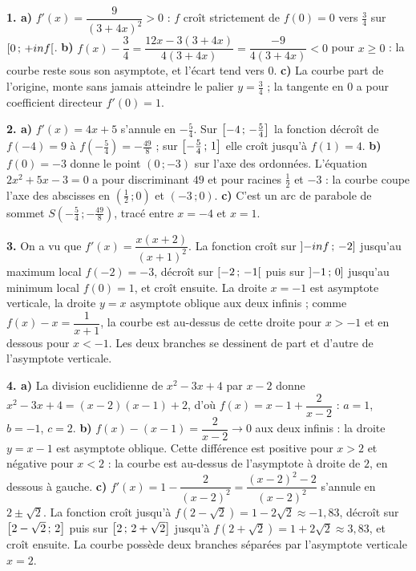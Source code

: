 \begin{corrige}[annales]
\textbf{1. a)} $f'(x) = \dfrac{9}{(3+4x)^{2}} > 0$ : $f$ croît strictement de
$f(0) = 0$ vers $\frac34$ sur $\left[0\,;\,+inf\right[$.
\textbf{b)} $f(x)-\dfrac34 = \dfrac{12x-3(3+4x)}{4(3+4x)}
= \dfrac{-9}{4(3+4x)} < 0$ pour $x \geq 0$ : la courbe reste sous son
asymptote, et l'écart tend vers $0$.
\textbf{c)} La courbe part de l'origine, monte sans jamais atteindre le
palier $y = \frac34$ ; la tangente en $0$ a pour coefficient directeur
$f'(0) = 1$.

\textbf{2. a)} $f'(x) = 4x+5$ s'annule en $-\frac54$. Sur
$\left[-4\,;\,-\frac54\right]$ la fonction décroît de $f(-4) = 9$ à
$f\left(-\frac54\right) = -\frac{49}{8}$ ; sur
$\left[-\frac54\,;\,1\right]$ elle croît jusqu'à $f(1) = 4$.
\textbf{b)} $f(0) = -3$ donne le point $(0\,;-3)$ sur l'axe des ordonnées.
L'équation $2x^{2}+5x-3 = 0$ a pour discriminant $49$ et pour racines
$\frac12$ et $-3$ : la courbe coupe l'axe des abscisses en
$\left(\frac12\,;0\right)$ et $(-3\,;0)$.
\textbf{c)} C'est un arc de parabole de sommet
$S\left(-\frac54\,;-\frac{49}{8}\right)$, tracé entre $x = -4$ et $x = 1$.

\textbf{3.} On a vu que
$f'(x) = \dfrac{x(x+2)}{(x+1)^{2}}$. La fonction croît sur
$\left]-inf\,;\,-2\right]$ jusqu'au maximum local $f(-2) = -3$, décroît sur
$\left[-2\,;\,-1\right[$ puis sur $\left]-1\,;\,0\right]$ jusqu'au minimum local
$f(0) = 1$, et croît ensuite. La droite $x = -1$ est asymptote verticale, la
droite $y = x$ asymptote oblique aux deux infinis ; comme
$f(x)-x = \dfrac{1}{x+1}$, la courbe est au-dessus de cette droite pour
$x > -1$ et en dessous pour $x < -1$. Les deux branches se dessinent de part
et d'autre de l'asymptote verticale.

\textbf{4. a)} La division euclidienne de $x^{2}-3x+4$ par $x-2$ donne
$x^{2}-3x+4 = (x-2)(x-1)+2$, d'où
$f(x) = x-1+\dfrac{2}{x-2}$ : $a = 1$, $b = -1$, $c = 2$.
\textbf{b)} $f(x)-(x-1) = \dfrac{2}{x-2} \to 0$ aux deux infinis : la droite
$y = x-1$ est asymptote oblique. Cette différence est positive pour $x>2$ et
négative pour $x<2$ : la courbe est au-dessus de l'asymptote à droite de $2$,
en dessous à gauche.
\textbf{c)} $f'(x) = 1-\dfrac{2}{(x-2)^{2}} = \dfrac{(x-2)^{2}-2}{(x-2)^{2}}$
s'annule en $2\pm\sqrt2$. La fonction croît jusqu'à
$f\left(2-\sqrt2\right) = 1-2\sqrt2 \approx -1{,}83$, décroît sur
$\left[2-\sqrt2\,;\,2\right]$ puis sur $\left[2\,;\,2+\sqrt2\right]$ jusqu'à
$f\left(2+\sqrt2\right) = 1+2\sqrt2 \approx 3{,}83$, et croît ensuite. La
courbe possède deux branches séparées par l'asymptote verticale $x = 2$.


\end{corrige}
